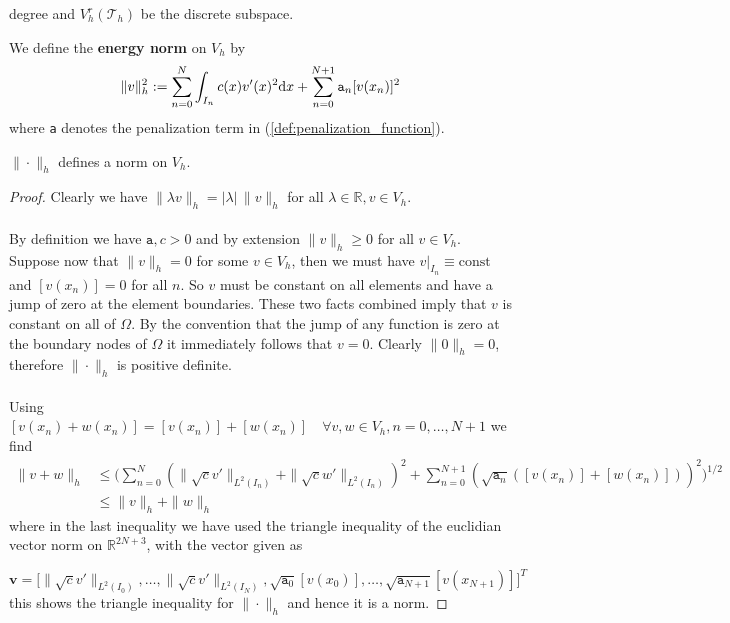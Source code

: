 degree and $V_h^r(\mathcal{T}_h)$ be the discrete subspace.
\begin{definition}
    We define the \textbf{energy norm} on $V_h$ by 
    \begin{equation}
        \label{def:energy_norm}
        \|v\|_h^2 := \sum_{n=0}^{N} \int_{I_n} c(x)v'(x)^2\text{d}x + \sum_{n=0}^{N+1}{\normalfont\texttt{a}_n}[v(x_n)]^2 
    \end{equation}
    where {\normalfont\texttt{a}} denotes the penalization term in (\ref{def:penalization_function}).
\end{definition}
\begin{lemma}
    $\|\cdot\|_h$ defines a norm on $V_h$.
\end{lemma}
\begin{proof}
    Clearly we have $\|\lambda v\|_h =|\lambda|\, \|v\|_h$ for all $\lambda \in \mathbb{R}, v\in V_h$. \\ \\
    By definition we have $\texttt{a}, c>0$ and by extension $\|v\|_h \geq 0$ for all
    $v\in V_h$. Suppose now that $\|v\|_h = 0$ for some $v\in V_h$, then we must have $v|_{I_n} \equiv \text{const}$ 
    and $[v(x_n)] = 0$ for all $n$. So $v$ must be constant on all elements and have a jump of zero at the element boundaries.
    These two facts combined imply that $v$ is constant on all of $\Omega$. By the convention that the jump 
    of any function is zero at the boundary nodes of $\Omega$ it immediately follows that $v=0$. Clearly
    $\|0\|_h=0$, therefore $\|\cdot\|_h$ is positive definite. \\ \\
    Using $[v(x_n) + w(x_n)] = [v(x_n)] + [w(x_n)] \quad \forall v,w \in V_h, n = 0,\ldots,N+1$ we find
    \begin{align*}
        \|v+w\|_h &\leq \Big(\sum_{n=0}^{N} (\|\sqrt{c}v'\|_{L^2(I_n)}+\|\sqrt{c}w'\|_{L^2(I_n)})^2 + 
        \sum_{n=0}^{N+1} (\sqrt{\texttt{a}_n}([v(x_n)] + [w(x_n)]))^2\Big)^{1/2} \\
        &\leq \|v\|_h + \|w\|_h
    \end{align*}
    where in the last inequality we have used the triangle inequality of the euclidian vector norm on $\mathbb{R}^{2N+3}$, with the vector given
    as 
    
    \[
    \textbf{v} = \big[\|\sqrt{c}v'\|_{L^2(I_0)},\ldots,\|\sqrt{c}v'\|_{L^2(I_N)}, \sqrt{\texttt{a}_0}[v(x_0)],\ldots,\sqrt{\texttt{a}_{N+1}}[v(x_{N+1})]\big]^T
    \]
    this shows the triangle inequality for $\|\cdot\|_h$ and hence it is a norm.
\end{proof}

